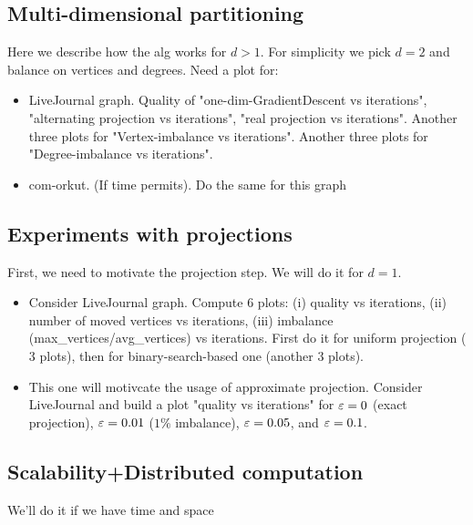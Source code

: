 \subsection{Multi-dimensional partitioning}

Here we describe how the alg works for $d>1$. For simplicity we pick $d=2$ and balance on vertices and degrees. Need a plot for:
\begin{itemize}
  \item LiveJournal graph. Quality of "one-dim-GradientDescent vs iterations", 
  "alternating projection vs iterations", "real projection vs iterations".
  Another three plots for "Vertex-imbalance vs iterations".
  Another three plots for "Degree-imbalance vs iterations".
  
  \item com-orkut. (If time permits). Do the same for this graph
\end{itemize}

\subsection{Experiments with projections}

First, we need to motivate the projection step. We will do it for $d=1$.
\begin{itemize}
  \item Consider LiveJournal graph. Compute $6$ plots: (i) quality vs iterations, (ii) number of moved vertices vs iterations, (iii) imbalance (max\_vertices/avg\_vertices) vs iterations. First do it for uniform projection ($3$ plots), then for binary-search-based one (another $3$ plots).
  
  \item This one will motivcate the usage of approximate projection. Consider LiveJournal and build a plot "quality vs iterations" for $\varepsilon=0$ (exact projection), $\varepsilon=0.01$ ($1\%$ imbalance), $\varepsilon=0.05$, and $\varepsilon=0.1$.
\end{itemize}


\subsection{Scalability+Distributed computation}
We'll do it if we have time and space

